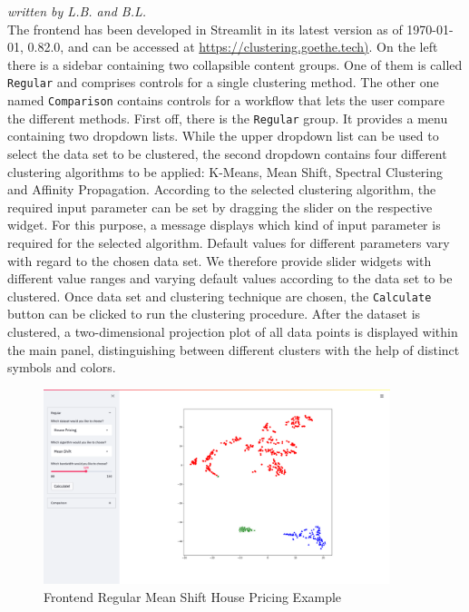 \textit{written by L.B. and B.L.}\\

The frontend has been developed in Streamlit \cite{streamlit2018} in its latest version as of \today, 0.82.0, and can be accessed at \url{https://clustering.goethe.tech)}.
On the left there is a sidebar containing two collapsible content groups. One of them is called \texttt{Regular} and comprises controls for a single clustering method. The other one named \texttt{Comparison} contains controls for a workflow that lets the user compare the different methods.
First off, there is the \texttt{Regular} group. It provides a menu containing two dropdown lists. While the upper dropdown list can be used to select the data set to be clustered, the second dropdown contains four different clustering algorithms to be applied: K-Means, Mean Shift, Spectral Clustering and Affinity Propagation. According to the selected clustering algorithm, the required input parameter can be set by dragging the slider on the respective widget. For this purpose, a message displays which kind of input parameter is required for the selected algorithm. 
Default values for different parameters vary with regard to the chosen data set. We therefore provide slider widgets with different value ranges and varying default values according to the data set to be clustered.
Once data set and clustering technique are chosen, the \texttt{Calculate} button can be clicked to run the clustering procedure.
After the dataset is clustered, a two-dimensional projection plot of all data points is displayed within the main panel, distinguishing between different clusters with the help of distinct symbols and colors.

\begin{figure}[H]
%
\begin{center}
\includegraphics[width=0.9\textwidth]{images/frontend_regular.png}
\caption{Frontend Regular Mean Shift House Pricing Example}
\end{center}
\label{img:frontend_screenshot_regular}
\end{figure}

